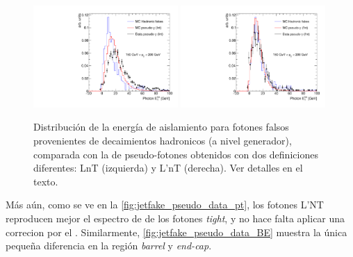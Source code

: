 \begin{figure}[!htbp]
  \centering

  \includegraphics[width=0.49\textwidth]{figures/bkg_mc_pseudo_data_SR_l_ptbin}
  \includegraphics[width=0.49\textwidth]{figures/bkg_mc_pseudo_data_SR_lp_ptbin}

  \caption{Distribución de la energía de aislamiento para fotones falsos
    provenientes de decaimientos hadronicos (a nivel generador), comparada con
    la de pseudo-fotones obtenidos con dos definiciones diferentes: LnT (izquierda) y L'nT (derecha). Ver detalles en el texto.}
  \label{fig:jetfake_mc_data}

\end{figure}

Más aún, como se ve en la \cref{fig:jetfake_pseudo_data_pt}, los fotones L'NT
reproducen mejor el espectro de {\pt} de los fotones \emph{tight}, y no hace falta aplicar
una correcion por el {\pt}. Similarmente,
\cref{fig:jetfake_pseudo_data_BE} muestra la única pequeña diferencia en la
región \emph{barrel} y \emph{end-cap}.


